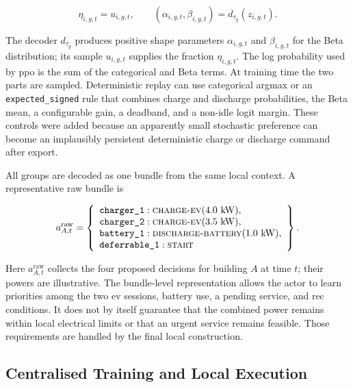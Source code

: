 \begin{equation}
\eta_{i,g,t}
=
u_{i,g,t},
\qquad
(\alpha_{i,g,t},\beta_{i,g,t})
=
d_{\tau_g}(z_{i,g,t}).
\label{eq:port-parameters}
\end{equation}

The decoder $d_{\tau_g}$ produces positive shape parameters $\alpha_{i,g,t}$ and $\beta_{i,g,t}$ for the Beta distribution; its sample $u_{i,g,t}$ supplies the fraction $\eta_{i,g,t}$. The log probability used by \gls{ppo} is the sum of the categorical and Beta terms. At training time the two parts are sampled. Deterministic replay can use categorical argmax or an \texttt{expected\_signed} rule that combines charge and discharge probabilities, the Beta mean, a configurable gain, a deadband, and a non-idle logit margin. These controls were added because an apparently small stochastic preference can become an implausibly persistent deterministic charge or discharge command after export.

All groups are decoded as one bundle from the same local context. A representative raw bundle is

\begin{equation}
a^{\mathrm{raw}}_{A,t}
=
\left\{
\begin{array}{l}
\texttt{charger\_1}:\textsc{charge-ev}(4.0\ \mathrm{kW}),\\
\texttt{charger\_2}:\textsc{charge-ev}(3.5\ \mathrm{kW}),\\
\texttt{battery\_1}:\textsc{discharge-battery}(1.0\ \mathrm{kW}),\\
\texttt{deferrable\_1}:\textsc{start}
\end{array}
\right\}.
\label{eq:running-raw-bundle}
\end{equation}

Here $a^{\mathrm{raw}}_{A,t}$ collects the four proposed decisions for building $A$ at time $t$; their powers are illustrative. The bundle-level representation allows the actor to learn priorities among the two \gls{ev} sessions, battery use, a pending service, and \gls{rec} conditions. It does not by itself guarantee that the combined power remains within local electrical limits or that an urgent service remains feasible. Those requirements are handled by the final local construction.

\subsection{Centralised Training and Local Execution}
\label{sec:timarl-joint-training}

